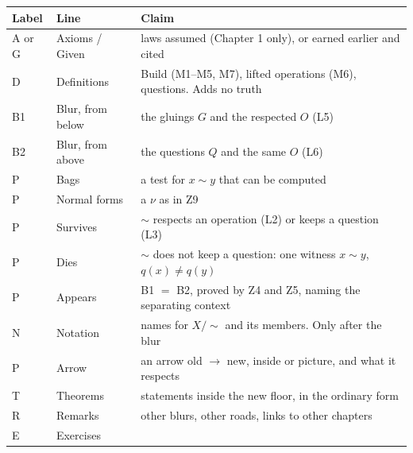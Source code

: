 \begin{center}
\renewcommand{\arraystretch}{1.35}
\begin{tabular}{@{}l l >{\raggedright\arraybackslash}p{8.6cm}@{}}
\textbf{Label} & \textbf{Line} & \textbf{Claim} \\ \hline
A or G & Axioms / Given & laws assumed (Chapter 1 only), or earned earlier and cited \\
D & Definitions & Build (M1--M5, M7), lifted operations (M6), questions. Adds no truth \\
B1 & Blur, from below & the gluings $G$ and the respected $O$ (L5) \\
B2 & Blur, from above & the questions $Q$ and the same $O$ (L6) \\
P & Bags & a test for $x \sim y$ that can be computed \\
P & Normal forms & a $\nu$ as in Z9 \\
P & Survives & $\sim$ respects an operation (L2) or keeps a question (L3) \\
P & Dies & $\sim$ does not keep a question: one witness $x \sim y$, $q(x) \neq q(y)$ \\
P & Appears & B1 $=$ B2, proved by Z4 and Z5, naming the separating context \\
N & Notation & names for $X/{\sim}$ and its members. Only after the blur \\
P & Arrow & an arrow old $\to$ new, inside or picture, and what it respects \\
T & Theorems & statements inside the new floor, in the ordinary form \\
R & Remarks & other blurs, other roads, links to other chapters \\
E & Exercises & \\
\end{tabular}
\end{center}


